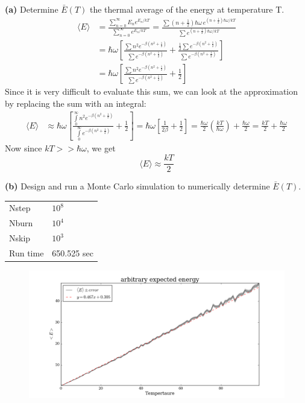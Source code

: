 \documentclass{article}
\begin{document}
\textbf{(a)} Determine $\bar{E}(T)$ the thermal average of the energy at temperature T. 
\begin{align*}
	\langle E \rangle 
	&= \frac{\sum\limits_{n=0}^{\infty} E_n e^{E_n/kT}}{\sum\limits_{n=0}^{\infty} e^{E_n/kT}}
	= \frac{\sum (n+\frac{1}{2})\hbar\omega \, e^{(n+\frac{1}{2})\hbar\omega/kT}}{\sum e^{(n+\frac{1}{2})\hbar\omega/kT}} \\
	&= \hbar\omega \left[\frac{\sum n^2 e^{-\beta (n^2+\frac{1}{2})}}{\sum e^{-\beta (n^2+\frac{1}{2})}} + \frac{ \frac{1}{2} \sum e^{-\beta (n^2+\frac{1}{2})} }{\sum e^{-\beta (n^2+\frac{1}{2})}} \right] \\
	&= \hbar\omega \left[\frac{\sum n^2 e^{-\beta (n^2+\frac{1}{2})}}{\sum e^{-\beta (n^2+\frac{1}{2})}} + \frac{1}{2} \right]
\end{align*}
Since it is very difficult to evaluate this sum, we can look at the approximation by replacing the sum with an integral:
\begin{align*}
	\langle E \rangle 
	&\approx \hbar\omega \left[\frac{\int\limits_{0}^{\infty} n^2 e^{-\beta (n^2+\frac{1}{2})}}{\int\limits_{0}^{\infty} e^{-\beta (n^2+\frac{1}{2})}} + \frac{1}{2} \right] 
	= \hbar\omega \left[\frac{1}{2\beta} + \frac{1}{2} \right]
	= \frac{\hbar\omega}{2} \left(\frac{kT}{\hbar\omega} \right) + \frac{\hbar\omega}{2}
	= \frac{kT}{2} + \frac{\hbar\omega}{2}
\end{align*}
Now since $kT >> \hbar\omega$, we get
\[\langle E \rangle \approx \frac{kT}{2} \]

\textbf{(b)} Design and run a Monte Carlo simulation to numerically determine $\bar{E}(T)$. \\

\begin{table}[H]
\centering
\begin{tabular}{|l|l|}
	\hline
	Nstep    & $10^8$ \\
	Nburn    & $10^4$ \\
	Nskip    & $10^3$ \\
	Run time & 650.525 sec \\
	\hline
\end{tabular}
\end{table}

\begin{figure}[H]
\begin{center}
\includegraphics[width=16cm]{../output/arbitrary/expected.png} 
\end{center}
\end{figure}
\end{document}
